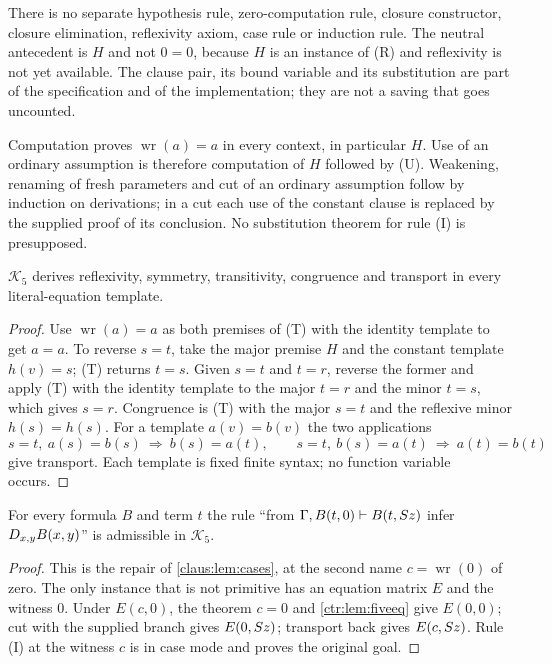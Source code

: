 There is no separate hypothesis rule, zero-computation rule, closure constructor, closure
elimination, reflexivity axiom, case rule or induction rule. The neutral antecedent is
$H$ and not $0=0$, because $H$ is an instance of (R) and reflexivity is not yet available.
The clause pair, its bound variable and its substitution are part of the specification and
of the implementation; they are not a saving that goes uncounted.

Computation proves $\operatorname{wr}(a)=a$ in every context, in particular $H$. Use of an
ordinary assumption is therefore computation of $H$ followed by (U). Weakening, renaming of
fresh parameters and cut of an ordinary assumption follow by induction on derivations; in a
cut each use of the constant clause is replaced by the supplied proof of its conclusion. No
substitution theorem for rule (I) is presupposed.

\begin{lemma}\label{ctr:lem:fiveeq}
$\mathcal K_5$ derives reflexivity, symmetry, transitivity, congruence and transport in
every literal-equation template.
\end{lemma}
\begin{proof}
Use $\operatorname{wr}(a)=a$ as both premises of (T) with the identity template to get
$a=a$. To reverse $s=t$, take the major premise $H$ and the constant template $h(v)=s$; (T)
returns $t=s$. Given $s=t$ and $t=r$, reverse the former and apply (T) with the identity
template to the major $t=r$ and the minor $t=s$, which gives $s=r$. Congruence is (T) with
the major $s=t$ and the reflexive minor $h(s)=h(s)$. For a template $a(v)=b(v)$ the two
applications
\[
 s=t,\ a(s)=b(s)\ \Longrightarrow\ b(s)=a(t),\qquad
 s=t,\ b(s)=a(t)\ \Longrightarrow\ a(t)=b(t)
\]
give transport. Each template is fixed finite syntax; no function variable occurs.
\end{proof}

\begin{lemma}\label{ctr:lem:fivecase}
For every formula $B$ and term $t$ the rule ``from $\Gamma,B(t,0)\vdash B(t,S z)$ infer
$D_{x,y}B(x,y)$'' is admissible in $\mathcal K_5$.
\end{lemma}
\begin{proof}
This is the repair of \cref{claus:lem:cases}, at the second name $c=\operatorname{wr}(0)$
of zero. The only instance that is not primitive has an equation matrix $E$ and the witness
$0$. Under $E(c,0)$, the theorem $c=0$ and \cref{ctr:lem:fiveeq} give $E(0,0)$; cut with the
supplied branch gives $E(0,S z)$; transport back gives $E(c,S z)$. Rule (I) at the
witness $c$ is in case mode and proves the original goal.
\end{proof}

